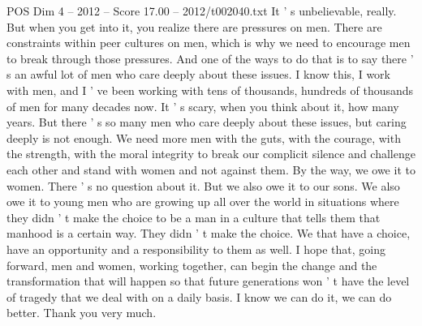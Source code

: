 \begin{textsample}{POS Dim 4 – 2012 – Score 17.00 – 2012/t002040.txt}
It ' s unbelievable, really.
But when you get into it, you realize there are pressures on men.
There are constraints within peer cultures on men, which is why we need to encourage men to break through those pressures.
And one of the ways to do that is to say there ' s an awful lot of men who care deeply about these issues.
I know this, I work with men, and I ' ve been working with tens of thousands, hundreds of thousands of men for many decades now.
It ' s scary, when you think about it, how many years.
But there ' s so many men who care deeply about these issues, but caring deeply is not enough.
We need more men with the guts, with the courage, with the strength, with the moral integrity to break our complicit silence and challenge each other and stand with women and not against them.
By the way, we owe it to women.
There ' s no question about it.
But we also owe it to our sons.
We also owe it to young men who are growing up all over the world in situations where they didn ' t make the choice to be a man in a culture that tells them that manhood is a certain way.
They didn ' t make the choice.
We that have a choice, have an opportunity and a responsibility to them as well.
I hope that, going forward, men and women, working together, can begin the change and the transformation that will happen so that future generations won ' t have the level of tragedy that we deal with on a daily basis.
I know we can do it, we can do better.
Thank you very much.

\end{textsample}
